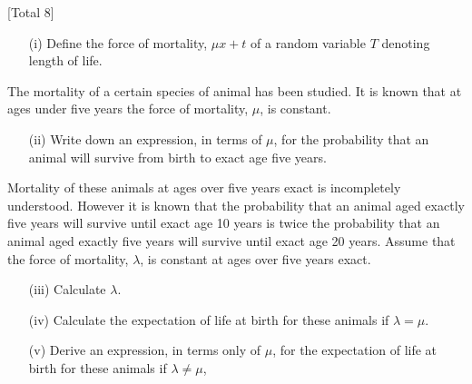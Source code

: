 \documentclass[a4paper,12pt]{article}
\begin{document}
[Total 8]
\begin{itemize} 
\item[(i)] Define the force of mortality, $\mu x+t$ of a random variable $T$ denoting length of
life. 
\end{itemize}
The mortality of a certain species of animal has been studied. It is known that at ages
under five years the force of mortality, $\mu$, is constant.
\begin{itemize} 
\item[(ii)] Write down an expression, in terms of $\mu$, for the probability that an animal
will survive from birth to exact age five years. 
\end{itemize}

Mortality of these animals at ages over five years exact is incompletely understood.
However it is known that the probability that an animal aged exactly five years will
survive until exact age 10 years is twice the probability that an animal aged exactly
five years will survive until exact age 20 years.
Assume that the force of mortality, $\lambda$, is constant at ages over five years exact.
\begin{itemize} 
\item[(iii)] Calculate $\lambda$. 
\item[(iv)] Calculate the expectation of life at birth for these animals if $\lambda = \mu$. 
\item[(v)] Derive an expression, in terms only of $\mu$, for the expectation of life at birth for
these animals if $\lambda ≠ \mu$, 
\end{itemize}
\end{document}
